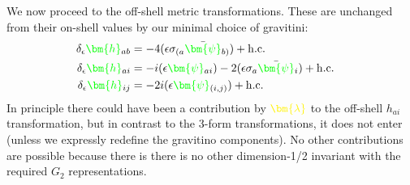 \documentclass[letter,12pt]{article} %
\def\physical#1{ {\color{green} {\bm {#1}} } }
\def\auxiliary#1{ {\color{yellow} {\bm {#1}} } }
\def\grinoXX{ \physical{\psi} }
\def\grinoXY{ \physical{\psi} }
\def\grinoYX{ \physical{\psi} }
\def\grinoYY{ \physical{\psi} }
\def\l{ \auxiliary{\lambda} }
\def\gravitonXX{\physical{h} }
\def\gravitonXY{\physical{h} }
\def\gravitonYY{\physical{h} }
\begin{document}
We now proceed to the off-shell metric transformations. These are unchanged from their on-shell values by our minimal choice of gravitini:
{%
\begin{align}
\delta_\epsilon \gravitonXX_{ab} &= -4 (\epsilon \sigma_{(a} \bar \grinoXX_{b)})
	+\mathrm{h.c.}
\cr
\delta_\epsilon \gravitonXY_{a i} &= - i (\epsilon\grinoXY_{a i}) -2(\epsilon \sigma_{a} \bar \grinoYX_{i}) 
	+\mathrm{h.c.}
\cr
\delta_\epsilon \gravitonYY_{ij} &= -2i (\epsilon\grinoYY_{(i, j)})
	+\mathrm{h.c.}
\nonumber	
\end{align}
}
In principle there could have been a contribution by $\l$ to the off-shell $h_{a i}$ transformation, but in contrast to the 3-form transformations, it does not enter (unless we expressly redefine the gravitino components). 
No other contributions are possible because there is there is no other dimension-1/2 invariant with the required $G_2$ representations.
\end{document}

